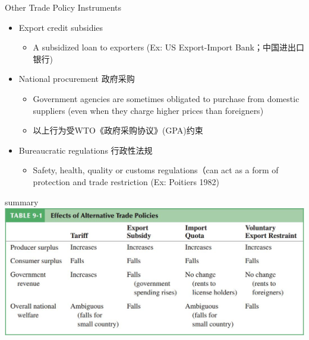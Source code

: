 \documentclass[10pt,hyperref={CJKbookmarks=true},xcolor=dvipsnames,aspectratio=169]{beamer}
\begin{document}
\begin{frame}{Other Trade Policy Instruments}

\begin{itemize}
\item Export credit subsidies 

\begin{itemize}
\item A subsidized loan to exporters (Ex: US Export-Import Bank；中国进出口银行) 
\end{itemize}
\item National procurement 政府采购

\begin{itemize}
\item Government agencies are sometimes obligated to purchase from domestic
suppliers (even when they charge higher prices than foreigners) 
\item 以上行为受WTO《政府采购协议》(GPA)约束
\end{itemize}
\item Bureaucratic regulations 行政性法规

\begin{itemize}
\item Safety, health, quality or customs regulations（can act as a form of
protection and trade restriction (Ex: Poitiers 1982)
\end{itemize}
\end{itemize}
\end{frame}

\begin{frame}{summary}
\centering \includegraphics[scale=0.5]{fig/instruments/summary}

\end{frame}
\end{document}
